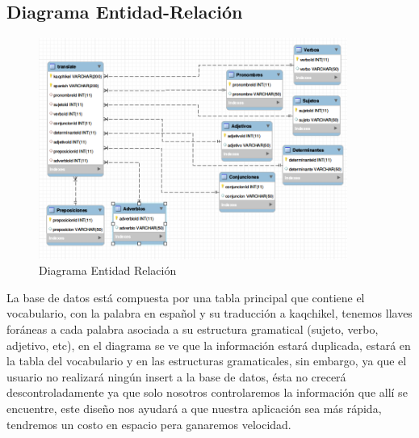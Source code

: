 \documentclass[a4paper,openright,12pt]{article}
\begin{document}
\subsection{Diagrama Entidad-Relación}
\begin{figure}[h]
	\centering
	\includegraphics[width=0.9\textwidth]{er}
	\caption{Diagrama Entidad Relación}
	\label{fig:er}
\end{figure}
La base de datos está compuesta por una tabla principal que contiene el vocabulario, con la palabra en español y su traducción a kaqchikel, tenemos llaves foráneas a cada palabra asociada a su estructura gramatical (sujeto, verbo, adjetivo, etc), en el diagrama se ve que la información estará duplicada, estará en la tabla del vocabulario y en las estructuras gramaticales, sin embargo, ya que el usuario no realizará ningún insert a la base de datos, ésta no crecerá descontroladamente ya que solo nosotros controlaremos la información que allí se encuentre, este diseño nos ayudará a que nuestra aplicación sea más rápida, tendremos un costo en espacio pera ganaremos velocidad.
\newpage
\end{document}
